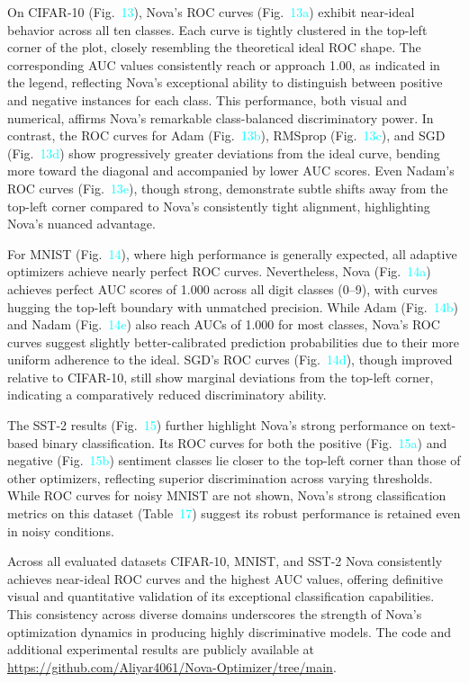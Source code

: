 \documentclass[10pt,twocolumn]{article}
\begin{document}
On CIFAR-10 (Fig.~\textcolor{cyan}{13}), Nova’s ROC curves (Fig.~\textcolor{cyan}{13a}) exhibit near-ideal behavior across all ten classes. Each curve is tightly clustered in the top-left corner of the plot, closely resembling the theoretical ideal ROC shape. The corresponding AUC values consistently reach or approach 1.00, as indicated in the legend, reflecting Nova’s exceptional ability to distinguish between positive and negative instances for each class. This performance, both visual and numerical, affirms Nova’s remarkable class-balanced discriminatory power. In contrast, the ROC curves for Adam (Fig.~\textcolor{cyan}{13b}), RMSprop (Fig.~\textcolor{cyan}{13c}), and SGD (Fig.~\textcolor{cyan}{13d}) show progressively greater deviations from the ideal curve, bending more toward the diagonal and accompanied by lower AUC scores. Even Nadam’s ROC curves (Fig.~\textcolor{cyan}{13e}), though strong, demonstrate subtle shifts away from the top-left corner compared to Nova’s consistently tight alignment, highlighting Nova’s nuanced advantage.

For MNIST (Fig.~\textcolor{cyan}{14}), where high performance is generally expected, all adaptive optimizers achieve nearly perfect ROC curves. Nevertheless, Nova (Fig.~\textcolor{cyan}{14a}) achieves perfect AUC scores of 1.000 across all digit classes (0–9), with curves hugging the top-left boundary with unmatched precision. While Adam (Fig.~\textcolor{cyan}{14b}) and Nadam (Fig.~\textcolor{cyan}{14e}) also reach AUCs of 1.000 for most classes, Nova’s ROC curves suggest slightly better-calibrated prediction probabilities due to their more uniform adherence to the ideal. SGD’s ROC curves (Fig.~\textcolor{cyan}{14d}), though improved relative to CIFAR-10, still show marginal deviations from the top-left corner, indicating a comparatively reduced discriminatory ability.

The SST-2 results (Fig.~\textcolor{cyan}{15}) further highlight Nova’s strong performance on text-based binary classification. Its ROC curves for both the positive (Fig.~\textcolor{cyan}{15a}) and negative (Fig.~\textcolor{cyan}{15b}) sentiment classes lie closer to the top-left corner than those of other optimizers, reflecting superior discrimination across varying thresholds. While ROC curves for noisy MNIST are not shown, Nova’s strong classification metrics on this dataset (Table~\textcolor{cyan}{17}) suggest its robust performance is retained even in noisy conditions.

Across all evaluated datasets CIFAR-10, MNIST, and SST-2 Nova consistently achieves near-ideal ROC curves and the highest AUC values, offering definitive visual and quantitative validation of its exceptional classification capabilities. This consistency across diverse domains underscores the strength of Nova’s optimization dynamics in producing highly discriminative models. The code and additional experimental results are publicly available at \url{https://github.com/Aliyar4061/Nova-Optimizer/tree/main}.
\end{document}
